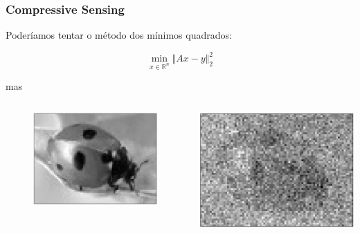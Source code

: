 \documentclass[11pt]{beamer}
\begin{document}
\begin{frame}
\frametitle{Compressive Sensing}
Poderíamos tentar o método dos mínimos quadrados:

$$\min_{x \in \mathbb{R}^n} \Vert Ax - y \Vert_2^2$$

mas

\begin{columns}[t]
\begin{center}
\begin{figure}
\includegraphics[scale=.25]{imagens/joaninha.png}
\end{figure}
\end{center}

\begin{center}
\includegraphics[scale=.25]{imagens/joaninhaMMQ_20porcento.png}
\end{center}
\end{columns}
\end{frame}
\end{document}
